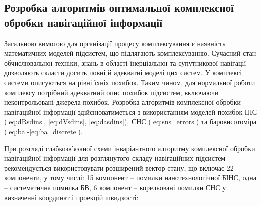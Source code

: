 \subsection{Розробка алгоритмів оптимальної комплексної обробки навігаційної інформації}

Загальною вимогою для організації процесу комплексування є наявність математичних 
моделей підсистем, що підлягають комплексуванню. Сучасний стан обчислювальної техніки, 
знань в області інерціальної та супутникової навігації дозволяють скласти досить 
повні й адекватні моделі цих систем. У комплексі системи описуються на рівні їхніх 
похибок. Таким чином, для нормальної роботи комплексу потрібний адекватний опис похибок 
підсистем, включаючи неконтрольовані джерела похибок. Розробка 
алгоритмів комплексної обробки навігаційної інформації здійснюватиметься з використанням 
моделей похибок ІНС (\eqref{eq:dRsdins}, \eqref{eq:dVsdins}, \eqref{eq:dasdins}), СНС (\eqref{eq:sns_errors}) 
та баровисотоміра (\eqref{eq:ba}-\eqref{eq:ba_discrete}).

При розгляді слабкозв'язаної схеми інваріантного алгоритму комплексної обробки навігаційної  
інформації для розглянутого складу навігаційних підсистем рекомендується використовувати 
розширений вектор стану, що включає 22 компоненти, у тому числі: 15 компонент -- помилки 
нанотехнологічної БІНС, одна -- систематична помилка БВ, 6 компонент -- корельовані 
помилки СНС у визначенні координат і проекцій швидкості:\\

